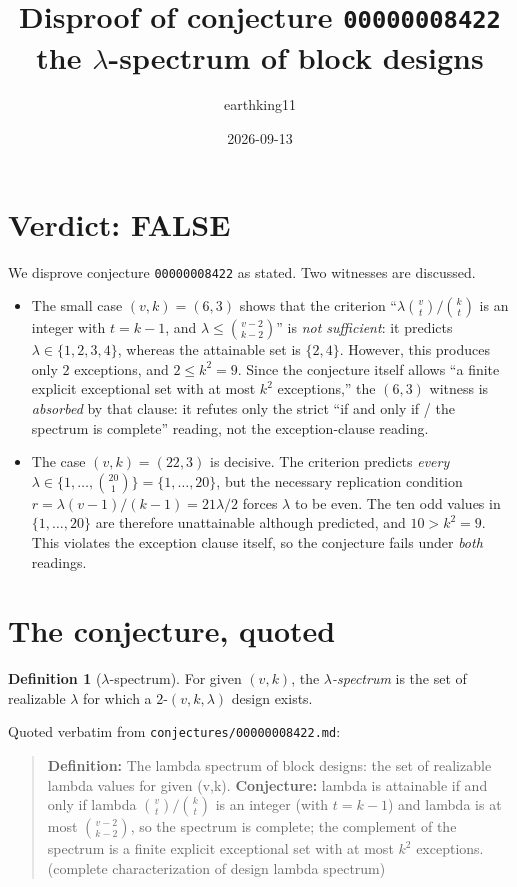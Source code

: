 \documentclass[11pt]{article}
\title{Disproof of conjecture \texttt{00000008422}\\ \large the $\lambda$-spectrum of block designs}
\author{earthking11}
\date{2026-09-13}
\theoremstyle{definition}
\newtheorem{definition}[theorem]{Definition}
\theoremstyle{remark}
\begin{document}
\maketitle

\section*{Verdict: FALSE}

We disprove conjecture \texttt{00000008422} as stated. Two witnesses are
discussed.

\begin{itemize}
\item The small case $(v,k)=(6,3)$ shows that the criterion
``$\lambda\binom{v}{t}/\binom{k}{t}$ is an integer with $t=k-1$, and
$\lambda\le\binom{v-2}{k-2}$'' is \emph{not sufficient}: it predicts
$\lambda\in\{1,2,3,4\}$, whereas the attainable set is $\{2,4\}$. However, this
produces only $2$ exceptions, and $2\le k^{2}=9$. Since the conjecture itself
allows ``a finite explicit exceptional set with at most $k^{2}$ exceptions,''
the $(6,3)$ witness is \emph{absorbed} by that clause: it refutes only the
strict ``if and only if / the spectrum is complete'' reading, not the
exception-clause reading.
\item The case $(v,k)=(22,3)$ is decisive. The criterion predicts
\emph{every} $\lambda\in\{1,\dots,\binom{20}{1}\}=\{1,\dots,20\}$, but the
necessary replication condition $r=\lambda(v-1)/(k-1)=21\lambda/2$ forces
$\lambda$ to be even. The ten odd values in $\{1,\dots,20\}$ are therefore
unattainable although predicted, and $10>k^{2}=9$. This violates the exception
clause itself, so the conjecture fails under \emph{both} readings.
\end{itemize}

\section{The conjecture, quoted}

\begin{definition}[$\lambda$-spectrum]
For given $(v,k)$, the \emph{$\lambda$-spectrum} is the set of realizable
$\lambda$ for which a $2$-$(v,k,\lambda)$ design exists.
\end{definition}

Quoted verbatim from \texttt{conjectures/00000008422.md}:

\begin{quote}
\textbf{Definition:} The lambda spectrum of block designs: the set of realizable
lambda values for given (v,k). \textbf{Conjecture:} lambda is attainable if and
only if lambda $\binom{v}{t}/\binom{k}{t}$ is an integer (with $t=k-1$) and
lambda is at most $\binom{v-2}{k-2}$, so the spectrum is complete; the
complement of the spectrum is a finite explicit exceptional set with at most
$k^{2}$ exceptions. (complete characterization of design lambda spectrum)
\end{quote}
\end{document}
